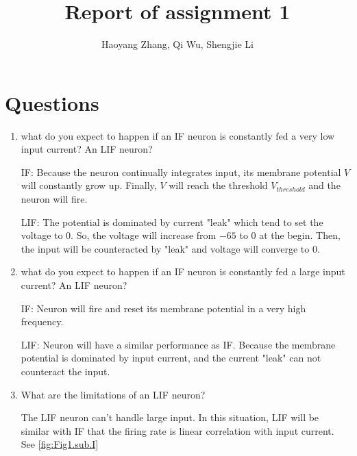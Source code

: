 \documentclass[11pt]{article}
\title{Report of assignment 1}
\author{Haoyang Zhang, Qi Wu, Shengjie Li}
\begin{document}
\maketitle

	\section*{Questions}
	\begin{enumerate}
		\item what do you expect to happen if an IF neuron is constantly fed a very low input current? An LIF neuron?
		
		IF: Because the neuron continually integrates input, its membrane potential $V$ will constantly grow up. Finally, $V$ will reach the threshold $V_{threshold}$ and the neuron will fire.
		
		LIF: The potential is dominated by current "leak" which tend to set the voltage to 0. So, the voltage will increase from $-65$ to $0$ at the begin. Then, the input will be counteracted by "leak" and voltage will converge to $0$.
		
		\item what do you expect to happen if an IF neuron is constantly fed a large input current? An LIF neuron?
			
		IF: Neuron will fire and reset its membrane potential in a very high frequency.
		
		LIF: Neuron will have a similar performance as IF. Because the membrane potential is dominated by input current, and the current "leak" can not counteract the input.
		
		\item What are the limitations of an LIF neuron?
			
		The LIF neuron can't handle large input. In this situation, LIF will be similar with IF that the firing rate is linear correlation with input current. See \ref{fig:Fig1.sub.I}
		

\end{enumerate}
\end{document}

